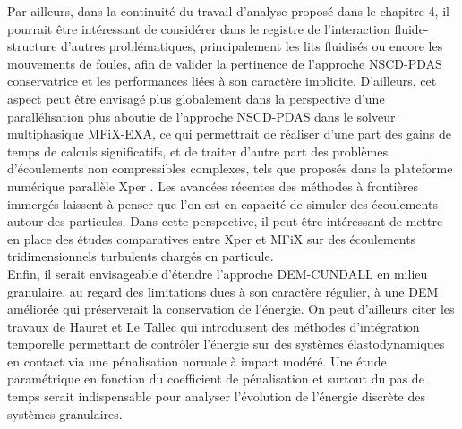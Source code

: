 Par ailleurs, dans la continuité du travail d'analyse proposé dans le chapitre 4, il pourrait être intéressant de considérer dans le registre de l'interaction fluide-structure d'autres problématiques, principalement les lits fluidisés ou encore les mouvements de foules, afin de valider la pertinence de l'approche NSCD-PDAS conservatrice et les performances liées à son caractère implicite. D'ailleurs, cet aspect peut être envisagé plus globalement dans la perspective d’une parallélisation plus aboutie de l'approche NSCD-PDAS dans le solveur multiphasique MFiX-EXA, ce qui permettrait de réaliser d'une part des gains de temps de calculs significatifs, et de traiter d'autre part des problèmes
d’écoulements non compressibles complexes, tels que proposés dans la plateforme numérique parallèle Xper \cite{dbouk2016df}. Les avancées récentes des méthodes à frontières immergés laissent à penser que l'on est en capacité de simuler des écoulements autour des particules. Dans cette perspective, il peut être intéressant de mettre en place des études comparatives entre Xper et MFiX sur des écoulements tridimensionnels turbulents chargés en particule.\\

Enfin, il serait envisageable d'étendre l'approche DEM-CUNDALL en milieu granulaire, au regard des limitations dues à son caractère régulier, à une DEM améliorée qui préserverait la conservation de l'énergie. On peut d'ailleurs citer les travaux de Hauret et Le Tallec \cite{hauret2006energy} qui introduisent des méthodes d'intégration temporelle permettant de contrôler l’énergie sur des systèmes élastodynamiques en contact via une pénalisation normale à impact modéré. Une étude paramétrique en fonction du coefficient de pénalisation et surtout du pas de temps serait indispensable pour analyser l'évolution de l'énergie discrète des systèmes granulaires.